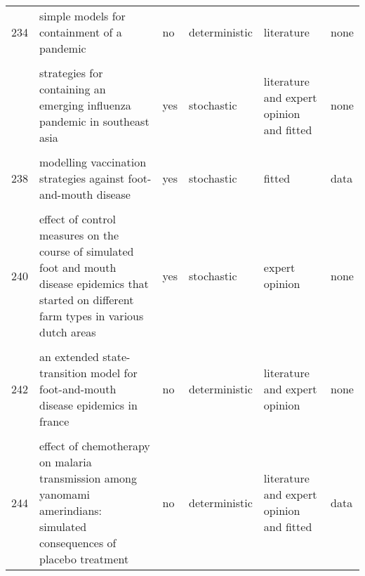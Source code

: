 \documentclass[
]{article}
\begin{document}
\begin{landscape}
\begin{longtable}{l>{\raggedright\arraybackslash}p{3cm}l>{\raggedright\arraybackslash}p{3cm}ll}
234 & simple models for containment of a pandemic & no & deterministic & literature & none\\
\cellcolor{gray!6}{235} & \cellcolor{gray!6}{statistical inference in a stochastic epidemic seir model with control intervention: ebola as a case study} & \cellcolor{gray!6}{no} & \cellcolor{gray!6}{stochastic} & \cellcolor{gray!6}{literature and expert opinion} & \cellcolor{gray!6}{data}\\
\addlinespace
236 & strategies for containing an emerging influenza pandemic in southeast asia & yes & stochastic & literature and expert opinion and fitted & none\\
\cellcolor{gray!6}{237} & \cellcolor{gray!6}{modeling alternative mitigation strategies for a hypothetical outbreak of foot-and-mouth disease in the united states} & \cellcolor{gray!6}{no} & \cellcolor{gray!6}{stochastic} & \cellcolor{gray!6}{literature and expert opinion} & \cellcolor{gray!6}{none}\\
238 & modelling vaccination strategies against foot-and-mouth disease & yes & stochastic & fitted & data\\
\cellcolor{gray!6}{239} & \cellcolor{gray!6}{a decision-tree to optimise control measures during the early stage of a foot-and-mouth disease epidemic} & \cellcolor{gray!6}{yes} & \cellcolor{gray!6}{deterministic} & \cellcolor{gray!6}{expert opinion} & \cellcolor{gray!6}{none}\\
240 & effect of control measures on the course of simulated foot and mouth disease epidemics that started on different farm types in various dutch areas & yes & stochastic & expert opinion & none\\
\addlinespace
\cellcolor{gray!6}{241} & \cellcolor{gray!6}{dynamics of the 2001 uk foot and mouth epidemic: stochastic dispersal in a heterogeneous landscape} & \cellcolor{gray!6}{yes} & \cellcolor{gray!6}{stochastic} & \cellcolor{gray!6}{fitted} & \cellcolor{gray!6}{data}\\
242 & an extended state-transition model for foot-and-mouth disease epidemics in france & no & deterministic & literature and expert opinion & none\\
\cellcolor{gray!6}{243} & \cellcolor{gray!6}{simulated economic consequences of foot-and-mouth disease epidemics and their public control in france} & \cellcolor{gray!6}{no} & \cellcolor{gray!6}{deterministic} & \cellcolor{gray!6}{literature and expert opinion} & \cellcolor{gray!6}{none}\\
244 & effect of chemotherapy on malaria transmission among yanomami amerindians: simulated consequences of placebo treatment & no & deterministic & literature and expert opinion and fitted & data\\

\end{longtable}
\end{landscape}
\end{document}
